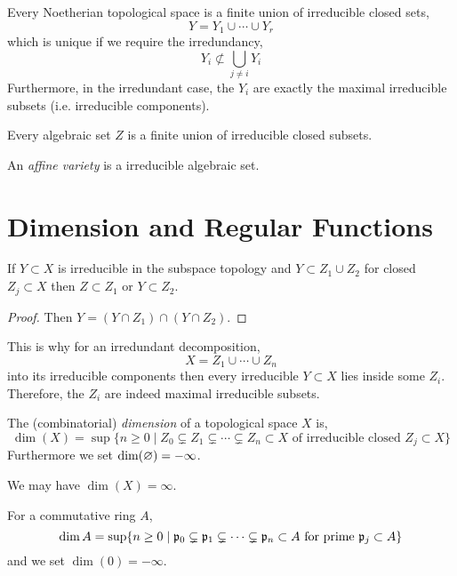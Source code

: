 \documentclass[12pt]{article}
\begin{document}
\begin{thm}
Every Noetherian topological space is a finite union of irreducible closed sets,
\[ Y = Y_1 \cup \cdots \cup Y_r \]
which is unique if we require the irredundancy,
\[ Y_i \not\subset \bigcup_{j \neq i} Y_i \]
Furthermore, in the irredundant case, the $Y_i$ are exactly the maximal irreducible subsets (i.e. irreducible components). 
\end{thm}

\begin{cor}
Every algebraic set $Z$ is a finite union of irreducible closed subsets.
\end{cor}

\begin{defn}
An \textit{affine variety} is a irreducible algebraic set.
\end{defn}

\section{Dimension and Regular Functions}

\begin{lemma}
If $Y \subset X$ is irreducible in the subspace topology and $Y \subset Z_1 \cup Z_2$ for closed $Z_j \subset X$ then $Z \subset Z_1$ or $Y \subset Z_2$.
\end{lemma}

\begin{proof}
Then $Y = (Y \cap Z_1) \cap (Y \cap Z_2)$.
\end{proof}

\begin{rmk}
This is why for an irredundant decomposition,
\[ X = Z_1 \cup \cdots \cup Z_n \]
into its irreducible components then every irreducible $Y \subset X$ lies inside some $Z_i$. Therefore, the $Z_i$ are indeed maximal irreducible subsets.
\end{rmk}

\begin{defn}
The (combinatorial) \textit{dimension} of a topological space $X$ is,
\[ \dim(X) = \sup \{ n \ge 0 \mid Z_0 \subsetneq Z_1 \subsetneq \cdots \subsetneq Z_n \subset X \text{ of irreducible closed } Z_j \subset X \} \]
Furthermore we set $\dim(\varnothing) = -\infty$.
\end{defn}

\begin{rmk}
We may have $\dim(X) = \infty$.
\end{rmk}

\begin{defn}
For a commutative ring $A$,
\[ \dim{A} = \sup\{ n \ge 0 \mid \mathfrak{p}_0 \subsetneq \mathfrak{p}_1 \subsetneq \cdots \subsetneq \mathfrak{p}_n \subset A \text{ for prime } \mathfrak{p}_j \subset A \} \]
and we set $\dim{(0)} = - \infty$.
\end{defn}
\end{document}
